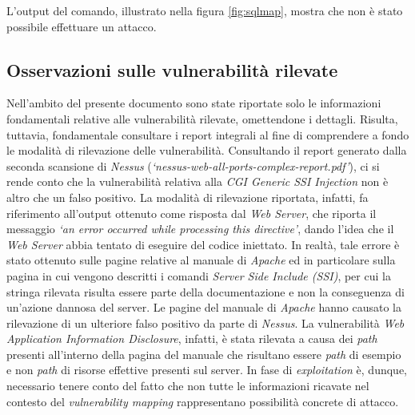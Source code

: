 L'output del comando, illustrato nella figura \ref{fig:sqlmap}, mostra che non è stato possibile effettuare un attacco. 
\subsection{Osservazioni sulle vulnerabilità rilevate}
Nell'ambito del presente documento sono state riportate solo le informazioni fondamentali relative alle vulnerabilità rilevate, omettendone i dettagli. Risulta, tuttavia, fondamentale consultare i report integrali al fine di comprendere a fondo le modalità di rilevazione delle vulnerabilità. Consultando il report generato dalla seconda scansione di \emph{Nessus} (\emph{`nessus-web-all-ports-complex-report.pdf'}), ci si rende conto che la vulnerabilità relativa alla \emph{CGI Generic SSI Injection} non è altro che un falso positivo. La modalità di rilevazione riportata, infatti, fa riferimento all'output ottenuto come risposta dal \emph{Web Server}, che riporta il messaggio \emph{`an error occurred while processing this directive'}, dando l'idea che il \emph{Web Server} abbia tentato di eseguire del codice iniettato. In realtà, tale errore è stato ottenuto sulle pagine relative al manuale di \emph{Apache} ed in particolare sulla pagina in cui vengono descritti i comandi \emph{Server Side Include (SSI)}, per cui la stringa rilevata risulta essere parte della documentazione e non la conseguenza di un'azione dannosa del server. Le pagine del manuale di \emph{Apache} hanno causato la rilevazione di un ulteriore falso positivo da parte di \emph{Nessus}. La vulnerabilità \emph{Web Application Information Disclosure}, infatti, è stata rilevata a causa dei \emph{path} presenti all'interno della pagina del manuale che risultano essere \emph{path} di esempio e non \emph{path} di risorse effettive presenti sul server. In fase di \emph{exploitation} è, dunque, necessario tenere conto del fatto che non tutte le informazioni ricavate nel contesto del \emph{vulnerability mapping} rappresentano possibilità concrete di attacco.